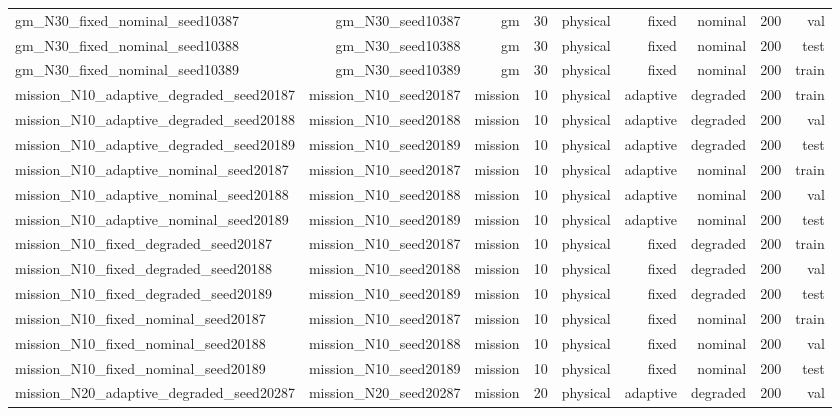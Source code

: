 \begin{tabular}{lrrrrrrrr}
gm\_N30\_fixed\_nominal\_seed10387 & gm\_N30\_seed10387 & gm & 30 & physical & fixed & nominal & 200 & val \\
gm\_N30\_fixed\_nominal\_seed10388 & gm\_N30\_seed10388 & gm & 30 & physical & fixed & nominal & 200 & test \\
gm\_N30\_fixed\_nominal\_seed10389 & gm\_N30\_seed10389 & gm & 30 & physical & fixed & nominal & 200 & train \\
mission\_N10\_adaptive\_degraded\_seed20187 & mission\_N10\_seed20187 & mission & 10 & physical & adaptive & degraded & 200 & train \\
mission\_N10\_adaptive\_degraded\_seed20188 & mission\_N10\_seed20188 & mission & 10 & physical & adaptive & degraded & 200 & val \\
mission\_N10\_adaptive\_degraded\_seed20189 & mission\_N10\_seed20189 & mission & 10 & physical & adaptive & degraded & 200 & test \\
mission\_N10\_adaptive\_nominal\_seed20187 & mission\_N10\_seed20187 & mission & 10 & physical & adaptive & nominal & 200 & train \\
mission\_N10\_adaptive\_nominal\_seed20188 & mission\_N10\_seed20188 & mission & 10 & physical & adaptive & nominal & 200 & val \\
mission\_N10\_adaptive\_nominal\_seed20189 & mission\_N10\_seed20189 & mission & 10 & physical & adaptive & nominal & 200 & test \\
mission\_N10\_fixed\_degraded\_seed20187 & mission\_N10\_seed20187 & mission & 10 & physical & fixed & degraded & 200 & train \\
mission\_N10\_fixed\_degraded\_seed20188 & mission\_N10\_seed20188 & mission & 10 & physical & fixed & degraded & 200 & val \\
mission\_N10\_fixed\_degraded\_seed20189 & mission\_N10\_seed20189 & mission & 10 & physical & fixed & degraded & 200 & test \\
mission\_N10\_fixed\_nominal\_seed20187 & mission\_N10\_seed20187 & mission & 10 & physical & fixed & nominal & 200 & train \\
mission\_N10\_fixed\_nominal\_seed20188 & mission\_N10\_seed20188 & mission & 10 & physical & fixed & nominal & 200 & val \\
mission\_N10\_fixed\_nominal\_seed20189 & mission\_N10\_seed20189 & mission & 10 & physical & fixed & nominal & 200 & test \\
mission\_N20\_adaptive\_degraded\_seed20287 & mission\_N20\_seed20287 & mission & 20 & physical & adaptive & degraded & 200 & val \\

\end{tabular}
